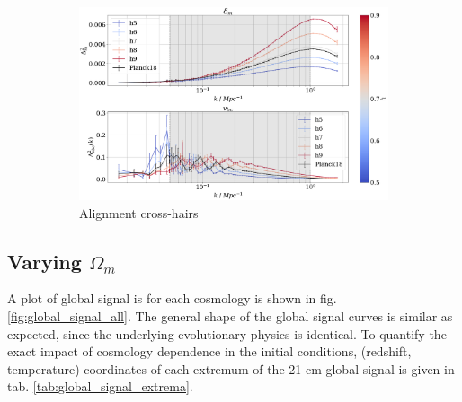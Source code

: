 \documentclass[floats,floatfix,showpacs,amssymb,prd,superscriptaddress,nofootinbib]{revtex4-2} %
\begin{document}
\begin{figure}[H]
\begin{subfigure}[b]{0.9\textwidth}
         \includegraphics[width=\textwidth]{images/ic_power_spectra/compare_cosmologies_averaged_power_spectra_h.png}
         \caption{Alignment cross-hairs}
         \label{fig:averaged_IC_power_spectra_h}
     \end{subfigure}
        \caption{}
        \label{fig:averaged_IC_power_spectra}
\end{figure}


\subsection{Varying $\Omega_m$}

A plot of global signal is for each cosmology is shown in fig. \ref{fig:global_signal_all}. The general shape of the global signal curves is similar as expected, since the underlying evolutionary physics is identical. To quantify the exact impact of cosmology dependence in the initial conditions, (redshift, temperature) coordinates of each extremum of the 21-cm global signal is given in tab. \ref{tab:global_signal_extrema}.
\end{document}
